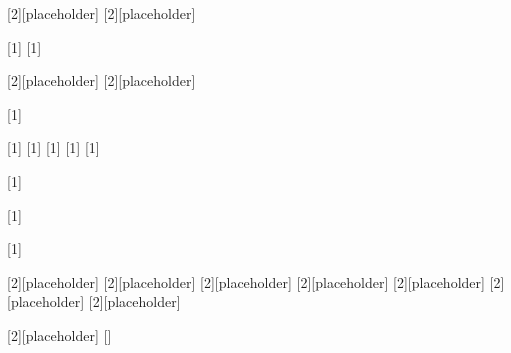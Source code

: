 \newrobustcmd{\betm}[2][placeholder]{%
  {}
}
\newrobustcmd{\cbetm}[2][placeholder]{%
}



\newrobustcmd{\atmp}[1]{%
}
\newrobustcmd{\btmp}[1]{%
}

\newrobustcmd{\ctmp}[2][placeholder]{%
  {}
}
\newrobustcmd{\dtmp}[2][placeholder]{%
  {}
}

\newrobustcmd{\etmp}[1]{%
}


\newrobustcmd{\batmp}[1]{%
}
\newrobustcmd{\bbtmp}[1]{%
}
\newrobustcmd{\bctmp}[1]{%
}
\newrobustcmd{\bdtmp}[1]{%
}
\newrobustcmd{\betmp}[1]{%
}


\newrobustcmd{\ptl}[1]{%
}

\newrobustcmd{\etaf}[1]{%
}

\newrobustcmd{\epsf}[1]{%
}

\newrobustcmd{\RSO}[2][placeholder]{%
  {}
}
\newrobustcmd{\TSO}[2][placeholder]{%
  {}
}
\newrobustcmd{\FSO}[2][placeholder]{%
  {}
}
\newrobustcmd{\spinSO}[2][placeholder]{%
  {}
}
\newrobustcmd{\RLambdaSO}[2][placeholder]{%
  {}
}
\newrobustcmd{\TLambdaSO}[2][placeholder]{%
  {}
}
\newrobustcmd{\KSO}[2][placeholder]{%
  {}
}


\newrobustcmd{\bper}[2][placeholder]{%
[]%
}



